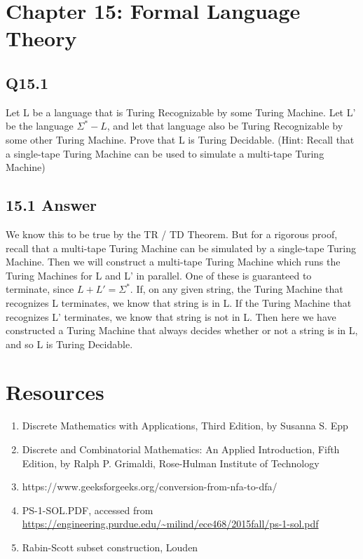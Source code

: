 \documentclass{article}
\begin{document}
\section*{Chapter 15: Formal Language Theory}
\subsection*{Q15.1}
Let L be a language that is Turing Recognizable by some Turing Machine. Let L' be the language $\Sigma^* - L$,
and let that language also be Turing Recognizable by some other Turing Machine. Prove that L is Turing Decidable.
(Hint: Recall that a single-tape Turing Machine can be used to simulate a multi-tape Turing Machine)
\newpage
\subsection*{15.1 Answer}
We know this to be true by the TR / TD Theorem. But for a rigorous proof, recall that a multi-tape Turing Machine can be simulated by
a single-tape Turing Machine. Then we will construct a multi-tape Turing Machine which runs the Turing Machines for L and L' in parallel. One of these
is guaranteed to terminate, since $L + L' = \Sigma^*$. If, on any given string, the Turing Machine that recognizes L terminates, 
we know that string is in L. If the Turing Machine that recognizes L' terminates, we know that string is not in L. Then here we have
constructed a Turing Machine that always decides whether or not a string is in L, and so L is Turing Decidable.
\newpage
\section*{Resources}
\begin{enumerate}
\item Discrete Mathematics with Applications, Third Edition, by Susanna S. Epp
\item Discrete and Combinatorial Mathematics: An Applied Introduction, Fifth Edition, by Ralph P. Grimaldi, Rose-Hulman Institute of Technology

\item https://www.geeksforgeeks.org/conversion-from-nfa-to-dfa/ 
\item PS-1-SOL.PDF, accessed from \url{https://engineering.purdue.edu/~milind/ece468/2015fall/ps-1-sol.pdf}
\item Rabin-Scott subset construction, Louden
\end{enumerate}
\end{document}
